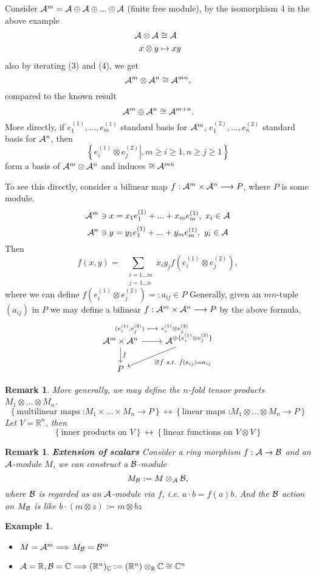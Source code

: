 \documentclass[11pt]{article}
\newtheorem{rmk}[thm]{Remark}
\newtheorem{ex}[thm]{Example}
\newcommand{\reals}{\mathbb R}
\newcommand{\cplx}{\mathbb C}
\newcommand{\cala}{{\cal A}}
\newcommand{\calb}{{\cal B}}
\newcommand{\rta}{\rightarrow}
\newcommand{\Lrta}{\Longrightarrow}
\newcommand{\lrta}{\longrightarrow}
\begin{document}
Consider $\cala^m=\cala\oplus \cala\oplus...\oplus \cala$ (finite free module), by the isomorphism 4 in the above example 
$$
\begin{aligned}
\cala\otimes \cala&\cong \cala\\
x\otimes y&\mapsto xy
\end{aligned}
$$
also by iterating (3) and (4), we get 
$$
\cala^m\otimes \cala^n\cong \cala^{mn},
$$
compared to the known result
$$
\cala^m\oplus \cala^n\cong \cala^{m+n}.
$$
More directly,
if $e_1^{(1)},...,e_m^{(1)}$ standard basis for $\cala^m$, $e_1^{(2)},...,e_n^{(2)}$ standard basis for $\cala^n$,
then
$$
\left.\left\{e_i^{(1)}\otimes e_j^{(2)}\right|,m\geq i\geq1,n\geq j\geq 1\right\}
$$
form a basis of $\cala^m\otimes \cala^n$ and induces $\cong \cala^{mn}$

To see this directly, consider a bilinear map $f:\cala^m\times \cala^n\lrta P$, where $P$ is some module.
$$
\cala^m\ni x=x_1 e_1^{(1)}+...+x_m e^{(1)}_m, \ x_i\in \cala
$$
$$
\cala^n\ni y=y_1 e_1^{(1)}+...+y_m e^{(1)}_m, \ y_i\in \cala
$$
Then 
$$
f(x,y)=\sum_{
\begin{aligned}
&i=1...m\\
&j=1...n
\end{aligned}}
x_i y_j f(e_i^{(1)}\otimes e_j^{(2)}),
$$
where we can define $f(e_i^{(1)}\otimes e_j^{(2)})=:a_{ij}\in P$
Generally, given an $mn$-tuple $(a_{ij})$ in $P$ we may define a bilinear $f:\cala^m\times\cala^n\lrta P$ by the above formula.
\[
\begin{tikzcd}
 \cala^m\times \cala^n \arrow[d,"f"] \ar[r]
 \arrow[phantom]{r}[ yshift=3.5 ex]{\substack{ (e_i^{(1)}, e_j^{(2)})\ \longmapsto\ e_i^{(1)}\otimes e_j^{(2)}}} 
 & \cala^{\oplus\{e_i^{(1)}\otimes e_j^{(2)}\}} \arrow[dl,"\exists !\tilde{f}\ s.t.\ \tilde{f}(e_{ij})=a_{ij}"]
 \\
P &    
\end{tikzcd}
\] 
\begin{rmk}
More generally, we may define the $n$-fold tensor products $M_1\otimes ...\otimes M_n$.
$$
\left\{\text{multilinear maps :}M_1\times...\times M_n\lrta P \right\}\leftrightarrow \left\{\text{linear maps :}M_1\otimes...\otimes M_n\lrta P \right\}
$$
Let $V=\reals^n$, then 
$$
\left\{\text{inner products on }V \right\}\leftrightarrow \left\{\text{linear functions on }V\otimes V\right\}
$$
\end{rmk}
\begin{rmk}
\textbf{Extension of scalars}
Consider a ring morphism $f:\cala\rta\mathcal{B}$ and an $\cala$-module $M$, we can construct a $\calb$-module
$$
M_\calb:=M\otimes_\cala \calb,
$$
where $\calb$ is regarded as an $\cala$-module via $f$, i.e. $a\cdot b=f(a)b$. And the $\calb$ action on $M_\calb$ is like
$b\cdot(m\otimes z):=m\otimes b z $
\end{rmk}
\begin{ex}\ 
\begin{itemize}
\item $M=\cala^m\Lrta M_\calb=\calb^m$
\item $\cala=\reals, \calb=\cplx\Lrta (\reals^n)_\cplx:=(\reals^n)\otimes_\reals \cplx\cong\cplx^n$
\end{itemize}
\end{ex}
\end{document}
